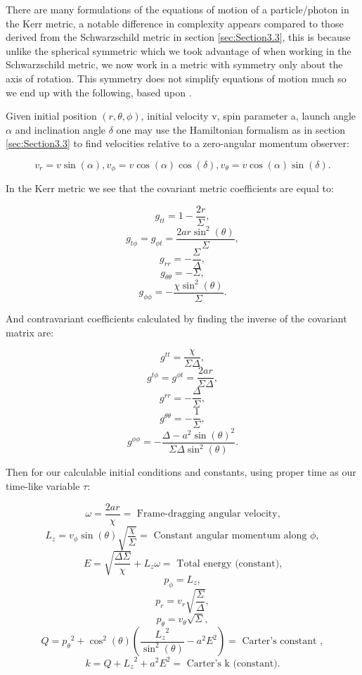 \documentclass[oneside,openright,frontopenright, singlespacing]{dmathesis}
\begin{document}
	There are many formulations of the equations of motion of a particle/photon in the Kerr metric, a notable difference in complexity appears compared to those derived from the Schwarzschild metric in section \ref{sec:Section3.3}, this is because unlike the spherical symmetric which we took advantage of when working in the Schwarzschild metric, we now work in a metric with symmetry only about the axis of rotation. This symmetry does not simplify equations of motion much so we end up with the following, based upon \cite{yukterezKerr}.

\vspace{1em}
	Given initial position $(r, \theta, \phi)$, initial velocity v, spin parameter a, launch angle $\alpha$ and inclination angle $\delta$ one may use the Hamiltonian formalism as in section \ref{sec:Section3.3} to find velocities relative to a zero-angular momentum observer:
	
	\[v_r = v\sin(\alpha), v_\phi = v\cos(\alpha)\cos(\delta), v_\theta = v\cos(\alpha)\sin(\delta).\]

	In the Kerr metric we see that the covariant metric coefficients are equal to:

	\[g_{tt} = 1-\frac{2r}{\Sigma},\]
	\[g_{t\phi} = g_{{\phi}t} = \frac{2ar\sin^2(\theta)}{\Sigma},\]
	\[g_{rr} = -\frac{\Sigma}{\Delta},\]
	\[g_{\theta\theta} = -\Sigma,\]
	\[g_{\phi\phi} = -\frac{\chi\sin^2(\theta)}{\Sigma}.\]

	And contravariant coefficients calculated by finding the inverse of the covariant matrix are:

	\[g^{tt} = \frac{\chi}{\Sigma\Delta},\]
	\[g^{t\phi} = g^{{\phi}t} = \frac{2ar}{\Sigma\Delta},\]
	\[g^{rr} = -\frac{\Delta}{\Sigma},\]
	\[g^{\theta\theta} = -\frac{1}{\Sigma},\]
	\[g^{\phi\phi} = -\frac{\Delta-a^2\sin(\theta)^2}{\Sigma\Delta\sin^2(\theta)}.\]

	Then for our calculable initial conditions and constants, using proper time as our time-like variable $\tau$:

	\[\omega = \frac{2ar}{\chi} = \mbox{ Frame-dragging angular velocity,}\]
	\[L_{z} = v_{\phi}\sin(\theta)\sqrt{\frac{\chi}{\Sigma}} = \mbox{ Constant angular momentum along } \phi,\]
	\[E = \sqrt{\frac{\Delta\Sigma}{\chi}}+L_{z}\omega = \mbox{ Total energy (constant),}\]
	\[p_{\phi} = L_{z},\]
	\[p_{r} = v_{r}\sqrt{\frac{\Sigma}{\Delta}},\]
	\[p_{\theta} = v_{\theta}\sqrt{\Sigma},\]
	\[Q = {p_{\theta}}^2+\cos^2(\theta)\left(\frac{{L_{z}}^2}{\sin^2(\theta)}-a^2E^2\right) = \mbox{ Carter's constant },\]
	\[k = Q+{L_{z}}^2+a^2E^2 = \mbox{ Carter's k (constant).}\]
\end{document}
